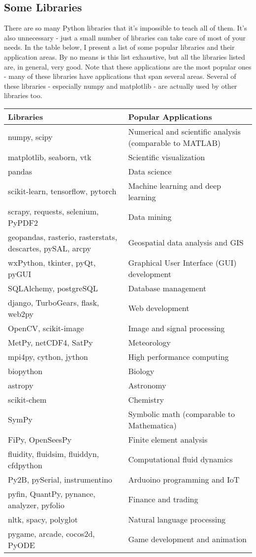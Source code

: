 \documentclass[12pt]{article}
\begin{document}
\subsection{Some Libraries}
There are so many Python libraries that it's impossible to teach all of them. It's also unnecessary - just a small number of libraries can take care of most of your needs. In the table below, I present a list of some popular libraries and their application areas. By no means is this list exhaustive, but all the libraries listed are, in general, very good. Note that these applications are the most popular ones - many of these libraries have applications that span several areas. Several of these libraries - especially numpy and matplotlib - are actually used by other libraries too.

\begin{tabular}{|p{2in}|p{3in}|}
\hline
\textbf{Libraries} & \textbf{Popular Applications} \\ \hline
numpy, scipy & Numerical and scientific analysis (comparable to MATLAB) \\ \hline
matplotlib, seaborn, vtk & Scientific visualization \\ \hline
pandas & Data science \\ \hline
scikit-learn, tensorflow, pytorch & Machine learning and deep learning \\ \hline
scrapy, requests, selenium, PyPDF2 & Data mining \\ \hline
geopandas, rasterio, rasterstats, descartes, pySAL, arcpy & Geospatial data analysis and GIS \\ \hline
wxPython, tkinter, pyQt, pyGUI & Graphical User Interface (GUI) development \\ \hline
SQLAlchemy, postgreSQL & Database management \\ \hline
django, TurboGears, flask, web2py & Web development \\ \hline
OpenCV, scikit-image & Image and signal processing \\ \hline
MetPy, netCDF4, SatPy & Meteorology \\ \hline
mpi4py, cython, jython & High performance computing \\ \hline
biopython & Biology \\ \hline
astropy & Astronomy \\ \hline
scikit-chem & Chemistry \\ \hline
SymPy & Symbolic math (comparable to Mathematica) \\ \hline
FiPy, OpenSeesPy & Finite element analysis \\ \hline
fluidity, fluidsim, fluiddyn, cfdpython & Computational fluid dynamics \\ \hline
Py2B, pySerial, instrumentino & Arduoino programming and IoT \\ \hline
pyfin, QuantPy, pynance, analyzer, pyfolio & Finance and trading \\ \hline
nltk, spacy, polyglot & Natural language processing \\ \hline
pygame, arcade, cocos2d, PyODE & Game development and animation \\ \hline
\end{tabular}
\end{document}

